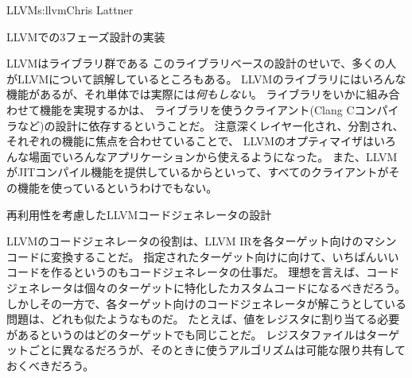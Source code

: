 \begin{aosachapter}{LLVM}{s:llvm}{Chris Lattner}
\begin{aosasect1}{LLVMでの3フェーズ設計の実装}
\begin{aosasect2}{LLVMはライブラリ群である}
このライブラリベースの設計のせいで、多くの人がLLVMについて誤解しているところもある。
LLVMのライブラリにはいろんな機能があるが、それ単体では実際には\emph{何もしない}。
ライブラリをいかに組み合わせて機能を実現するかは、
ライブラリを使うクライアント(Clang Cコンパイラなど)の設計に依存するということだ。
注意深くレイヤー化され、分割され、それぞれの機能に焦点を合わせていることで、
LLVMのオプティマイザはいろんな場面でいろんなアプリケーションから使えるようになった。
また、LLVMがJITコンパイル機能を提供しているからといって、すべてのクライアントがその機能を使っているというわけでもない。

\end{aosasect2}

\end{aosasect1}

\begin{aosasect1}{再利用性を考慮したLLVMコードジェネレータの設計}

LLVMのコードジェネレータの役割は、LLVM IRを各ターゲット向けのマシンコードに変換することだ。
指定されたターゲット向けに向けて、いちばんいいコードを作るというのもコードジェネレータの仕事だ。
理想を言えば、コードジェネレータは個々のターゲットに特化したカスタムコードになるべきだろう。
しかしその一方で、各ターゲット向けのコードジェネレータが解こうとしている問題は、どれも似たようなものだ。
たとえば、値をレジスタに割り当てる必要があるというのはどのターゲットでも同じことだ。
レジスタファイルはターゲットごとに異なるだろうが、そのときに使うアルゴリズムは可能な限り共有しておくべきだろう。


\end{aosasect1}
\end{aosachapter}
